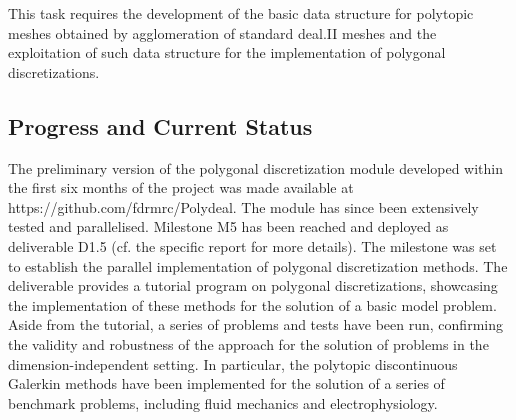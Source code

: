\documentclass[a4paper,12pt]{article}
\begin{document}
This task requires the development of the basic data structure for polytopic meshes obtained by agglomeration of standard deal.II meshes and the exploitation of such data structure for the implementation of polygonal discretizations.


 \subsection{Progress and Current Status}

The preliminary version of the polygonal discretization module developed within the first six months of the project was made available at https://github.com/fdrmrc/Polydeal.
The module has since been extensively tested and parallelised. 
Milestone M5 has been reached and deployed as deliverable D1.5 (cf. the specific report for more details). The milestone was set to establish the parallel implementation of polygonal discretization methods. The deliverable provides a tutorial program on polygonal discretizations, showcasing the implementation of these methods for the solution of a basic model problem. Aside from the tutorial, a series of problems and tests have been run, confirming the validity and robustness of the approach for the solution of problems in the dimension-independent setting. In particular, the polytopic discontinuous Galerkin methods have been implemented for the solution of a series of benchmark problems, including fluid mechanics and electrophysiology.
\end{document}
